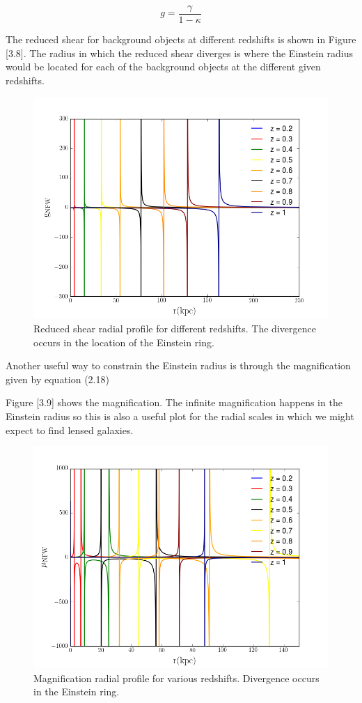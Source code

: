 \begin{equation}
g=\frac{\gamma}{1-\kappa}
\end{equation}

The reduced shear for background objects at different redshifts is shown in Figure [3.8]. The radius in which the reduced shear diverges is where the Einstein radius would be located for each of the background objects at the different given redshifts. 

\begin{figure}[H]
\centering
\includegraphics[width=12cm]{images/Reduced_Shear.png}
\caption[Reduced shear radial]{Reduced shear radial profile for different redshifts. The divergence occurs in the location of the Einstein ring.}
\end{figure}

Another useful way to constrain the Einstein radius is through the magnification given by equation (2.18)
 
Figure [3.9] shows the magnification. The infinite magnification happens in the Einstein radius so this is also a useful plot for the radial scales in which we might expect to find lensed galaxies.

\begin{figure}[H]
\centering
\includegraphics[width=12cm]{images/Magnification.png}
\caption[Magnification radial profile]{Magnification radial profile for various redshifts. Divergence occurs in the Einstein ring.}
\end{figure}

